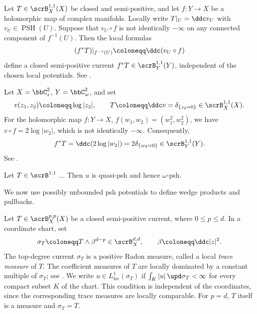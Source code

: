 \begin{construction}[label=\labelNFM{prop:pull-back-of-semipositive-11-current}, status=draft, tag=0000000]
	Let $T \in \scrB_X^{1,1}(X)$ be closed and semi-positive,
	and let $f:Y \to X$ be a holomorphic map of complex manifolds.
	Locally write $T|_U = \ddc v_U$ with $v_U \in \operatorname{PSH}(U)$.
	Suppose that $v_U \circ f$ is not identically $-\infty$ on any connected component of $f^{-1}(U)$.
	Then the local formulas
	\[ (f^*T)|_{f^{-1}(U)} \coloneqq \ddc(v_U \circ f) \]
	define a closed semi-positive current $f^*T \in \scrB_Y^{1,1}(Y)$, independent of the chosen local potentials.
  See \cite[Chapter~III, Proposition~1.19, and Chapter~I, Theorem~5.11]{Demailly-2012-ComplexAnalyticDifferential}.
\end{construction}

\begin{example}[label=\labelNFM{eg:pull-back-of-semipositive-11-currents}, status=draft, tag=0000000]
	Let $X = \bbC_z^2$, $Y = \bbC_w^2$, and set
	\[ v(z_1,z_2) \coloneqq \log|z_2|, \qquad T \coloneqq \ddc v = \delta_{\{z_2 = 0\}} \in \scrB_X^{1,1}(X). \]
	For the holomorphic map $f:Y \to X$, $f(w_1,w_2) = (w_1^2,w_2^2)$,
	we have $v \circ f = 2 \log|w_2|$, which is not identically $-\infty$.
	Consequently,
	\[ f^*T = \ddc(2 \log|w_2|) = 2 \delta_{\{w_2 = 0\}} \in \scrB_Y^{1,1}(Y). \]
	See \cite[Theorem~6.3.1 and Exercise~6.3.5]{Dinh-Sibony-2005-IntroductionTheoryCurrents}.
\end{example}

\begin{proposition}[label=\labelNFM{prop:potential-in-lelong-equation-is-quasi-psh-for-positive}, status=draft, tag=0000000]
	Let $T \in \scrB^{1,1}$ ... 
	Then $u$ is quasi-psh and hence $\omega$-psh.
	\Yang{}
\end{proposition}

We now use possibly unbounded psh potentials to define wedge products and pullbacks.

\begin{construction}[label=\labelNFM{constr:products-and-pullbacks-of-currents}, status=draft, tag=0000000]
	Let $T \in \scrB_X^{p,p}(X)$ be a closed semi-positive current, where $0 \leq p \leq d$.
	In a coordinate chart, set
	\[ \sigma_T \coloneqq T \wedge \beta^{d-p} \in \scrB_X^{d,d}, \qquad \beta \coloneqq \ddc|z|^2. \]
	The top-degree current $\sigma_T$ is a positive Radon measure, called a local \emph{trace measure} of $T$.
	The coefficient measures of $T$ are locally dominated by a constant multiple of $\sigma_T$;
	see \cite[Chapter~III, \S 1.B, Proposition~1.14]{Demailly-2012-ComplexAnalyticDifferential}.
	We write $u \in L^1_{\mathrm{loc}}(\sigma_T)$ if $\int_K |u|\,\upd\sigma_T < \infty$ for every compact subset $K$ of the chart.
	This condition is independent of the coordinates, since the corresponding trace measures are locally comparable.
	For $p = d$, $T$ itself is a measure and $\sigma_T = T$.
\end{construction}


